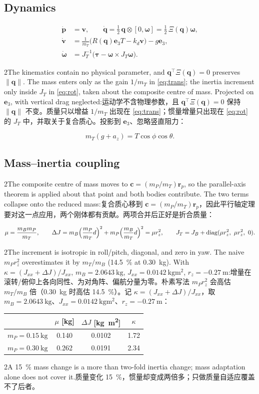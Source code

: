 \documentclass[10pt,a4paper]{article}
\numberwithin{equation}{section}
\newcommand{\dJ}{\Delta J}
\newcommand{\mB}{m_B}
\newcommand{\mP}{m_P}
\newcommand{\mT}{m_T}
\newcommand{\Jb}{J_B}
\newcommand{\Jt}{J_T}
\newcommand{\ev}{\bm{e}_3}
\newcommand{\rp}{\bm{r}_p}
\newcommand{\pair}[2]{\begin{paracol}{2}#1\switchcolumn #2\end{paracol}}
\newcommand{\bsub}[2]{\needspace{8\baselineskip}\subsection{#1\quad{\normalfont #2}}}
\begin{document}
\bsub{Dynamics}{动力学}
\begin{align}
\dot{\bm p}&=\bm v,\qquad
\dot{\bm q}=\tfrac12\,\bm q\otimes[0,\bm\omega]=\tfrac12\,\Xi(\bm q)\bm\omega,\label{eq:kin}\\
\dot{\bm v}&=\frac{1}{\mT}\bigl(R(\bm q)\ev T-k_d\bm v\bigr)-g\ev,\label{eq:trans}\\
\dot{\bm\omega}&=\Jt^{-1}\bigl(\bm\tau-\bm\omega\times\Jt\bm\omega\bigr).\label{eq:rot}
\end{align}
\pair{The kinematics contain no physical parameter, and $\bm q^\top\Xi(\bm q)=0$
preserves $\lVert\bm q\rVert$. The mass enters only as the gain $1/\mT$ in
\eqref{eq:trans}; the inertia increment only inside $\Jt$ in
\eqref{eq:rot}, taken about the composite centre of mass. Projected on $\ev$,
with vertical drag neglected:}
{运动学不含物理参数，且 $\bm q^\top\Xi(\bm q)=0$ 保持 $\lVert\bm q\rVert$ 不变。质量只以增益 $1/\mT$ 出现在 \eqref{eq:trans}；惯量增量只出现在 \eqref{eq:rot} 的 $\Jt$ 中，并取关于复合质心。投影到 $\ev$、忽略竖直阻力：}
\begin{equation}
\mT(g+a_z)=T\cos\phi\cos\theta .
\label{eq:vbal}
\end{equation}

\bsub{Mass--inertia coupling}{质量--惯量耦合}
\pair{The composite centre of mass moves to $\bm c=(\mP/\mT)\rp$, so the
parallel-axis theorem is applied about that point and both bodies contribute.
The two terms collapse onto the reduced mass:}
{复合质心移到 $\bm c=(\mP/\mT)\rp$，因此平行轴定理要对这一点应用，两个刚体都有贡献。两项合并后正好是折合质量：}
\begin{equation}
\mu=\frac{\mB\mP}{\mT},\qquad
\dJ=\mB\Bigl(\frac{\mP}{\mT}d\Bigr)^2+\mP\Bigl(\frac{\mB}{\mT}d\Bigr)^2=\mu r_z^2,\qquad
\Jt=\Jb+\mathrm{diag}(\mu r_z^2,\ \mu r_z^2,\ 0).
\label{eq:reduced}
\end{equation}
\pair{The increment is isotropic in roll/pitch, diagonal, and zero in yaw. The
naive $\mP r_z^2$ overestimates it by $\mT/\mB$ (\SI{14.5}{\percent} at
\SI{0.30}{\kg}). With $\kappa=(J_{xx}+\dJ)/J_{xx}$, $\mB=\SI{2.0643}{\kg}$,
$J_{xx}=\SI{0.0142}{\kg\meter\squared}$, $r_z=\SI{-0.27}{\meter}$:}
{增量在滚转/俯仰上各向同性、为对角阵、偏航分量为零。朴素写法 $\mP r_z^2$ 会高估 $\mT/\mB$ 倍（\SI{0.30}{\kg} 时高估 \SI{14.5}{\percent}）。记 $\kappa=(J_{xx}+\dJ)/J_{xx}$，取 $\mB=\SI{2.0643}{\kg}$、$J_{xx}=\SI{0.0142}{\kg\meter\squared}$、$r_z=\SI{-0.27}{\meter}$：}
\begin{center}\small
\begin{tabular}{@{}lccc@{}}
\toprule
& $\mu$ [kg] & $\dJ$ [\si{\kg\meter\squared}] & $\kappa$\\
\midrule
$\mP=\SI{0.15}{\kg}$ & 0.140 & 0.0102 & 1.72\\
$\mP=\SI{0.30}{\kg}$ & 0.262 & 0.0191 & 2.34\\
\bottomrule
\end{tabular}
\end{center}
\pair{A \SI{15}{\percent} mass change is a more than two-fold inertia change;
mass adaptation alone does not cover it.}
{质量变化 \SI{15}{\percent}，惯量却变成两倍多；只做质量自适应覆盖不了后者。}
\end{document}

